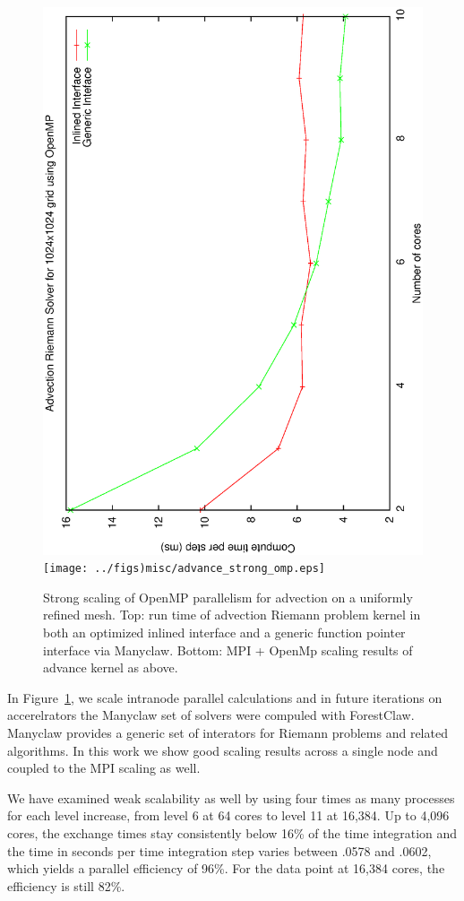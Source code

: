 \documentclass{IOS-Book-Article}     %
\newcommand{\forestclaw}{ForestClaw\xspace}
\newcommand{\manyclaw}{Manyclaw\xspace}
\newcommand{\Fig}[1]{Figure~\ref{fig:#1}}
\begin{document}
\begin{figure}
\begin{center}
  \includegraphics[angle=-90,width=.8\columnwidth]{../figs_misc/omp.eps}
  \\[1ex]
  \texttt{[image: ../figs)misc/advance\_strong\_omp.eps]}
\end{center}
\caption{Strong scaling of OpenMP parallelism for advection on a
  uniformly refined mesh.  Top: run time of advection Riemann problem kernel in both an optimized inlined interface and a generic function pointer interface via \manyclaw.  Bottom: MPI + OpenMp scaling results of advance kernel as above.
}
\label{fig:ompscale}
\end{figure}%

In \Fig{ompscale}, we scale intranode parallel calculations and in future iterations on accerelrators the \manyclaw set of solvers were compuled with \forestclaw.  \manyclaw provides a generic set of interators for Riemann problems and related algorithms. In this work we show good scaling results across a single node and coupled to the MPI scaling as well.

We have examined weak scalability as well by using four times as many processes
for each level increase, from level 6 at 64 cores to level 11 at 16,384.  Up to
4,096 cores, the exchange times stay consistently below 16\% of the time
integration and the time in seconds per time integration step varies between
.0578 and .0602, which yields a parallel efficiency of 96\%.  For the
data point at 16,384 cores, the efficiency is still 82\%.
\end{document}
